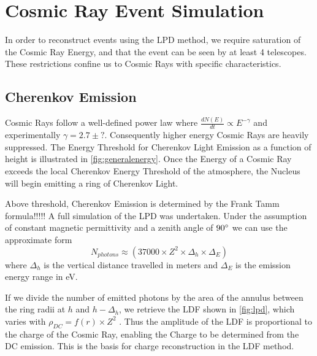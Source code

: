 \documentclass{article}
\begin{document}
\section{Cosmic Ray Event Simulation}
In order to reconstruct events using the LPD method, we require saturation of the Cosmic Ray Energy, and that the event can be seen by at least 4 telescopes. These restrictions confine us to Cosmic Rays with specific characteristics.

\subsection{Cherenkov Emission}
Cosmic Rays follow a well-defined power law where $ \frac{dN(E)}{dt} \propto E^{-\gamma} $ and experimentally $ \gamma = 2.7 \pm ? $. Consequently higher energy Cosmic Rays are heavily suppressed. The Energy Threshold for Cherenkov Light Emission as a function of height is illustrated in \ref{fig:generalenergy}. Once the Energy of a Cosmic Ray exceeds the local Cherenkov Energy Threshold of the atmosphere, the Nucleus will begin emitting a ring of Cherenkov Light. 

Above threshold, Cherenkov Emission is determined by the Frank Tamm formula!!!!! A full simulation of the LPD was undertaken. Under the assumption of constant magnetic permittivity and a zenith angle of $90\degree$ we can use the approximate form \[ N_{photons} \approx (37000 \times Z^{2} \times \Delta_{h} \times \Delta_{E})\] where $\Delta_{h}$ is the vertical distance travelled in meters and $\Delta_{E}$ is the emission energy range in eV.

If we divide the number of emitted photons by the area of the annulus between the ring radii at $h$ and $h - \Delta_{h}$, we retrieve the LDF shown in \ref{fig:lpd}, which varies with $ \rho_{DC}  = f(r) \times Z^{2}$ . Thus the amplitude of the LDF is proportional to the charge of the Cosmic Ray, enabling the Charge to be determined from the DC emission. This is the basis for charge reconstruction in the LDF method.
\end{document}
